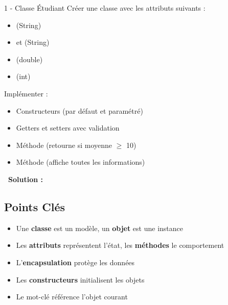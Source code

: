 \begin{exercice}{1 - Classe Étudiant}
    Créer une classe  avec les attributs suivants :
    \begin{itemize}
        \item {} (String)
        \item {} et  (String)
        \item {} (double)
        \item {} (int)
    \end{itemize}
    
    Implémenter :
    \begin{itemize}
        \item Constructeurs (par défaut et paramétré)
        \item Getters et setters avec validation
        \item Méthode  (retourne  si moyenne $\geq$ 10)
        \item Méthode  (affiche toutes les informations)
    \end{itemize}
    
    \vspace{5pt}
    
    \textbf{\faGithub\ Solution :} 
\end{exercice}


\subsection{Points Clés}

\begin{itemize}
    \item Une \textbf{classe} est un modèle, un \textbf{objet} est une instance
    \item Les \textbf{attributs} représentent l'état, les \textbf{méthodes} le comportement
    \item L'\textbf{encapsulation} protège les données
    \item Les \textbf{constructeurs} initialisent les objets
    \item Le mot-clé  référence l'objet courant
\end{itemize}

